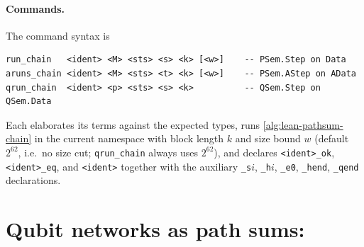 \paragraph{Commands.} The command syntax is
\begin{lstlisting}[style=grammar]
run_chain   <ident> <M> <sts> <s> <k> [<w>]    -- PSem.Step on Data
aruns_chain <ident> <M> <sts> <t> <k> [<w>]    -- PSem.AStep on AData
qrun_chain  <ident> <p> <sts> <s> <k>          -- QSem.Step on QSem.Data
\end{lstlisting}
Each elaborates its terms against the expected types, runs \cref{alg:lean-pathsum-chain} in the
current namespace with block length $k$ and size bound $w$ (default $2^{62}$, i.e.\ no size cut;
\textnormal{\texttt{qrun\_\allowbreak{}chain}} always uses $2^{62}$), and declares \textnormal{\texttt{<ident>\_\allowbreak{}ok}}, \textnormal{\texttt{<ident>\_\allowbreak{}eq}}, and
\textnormal{\texttt{<ident>}} together with the auxiliary \textnormal{\texttt{\_\allowbreak{}s}}$i$, \textnormal{\texttt{\_\allowbreak{}h}}$i$, \textnormal{\texttt{\_\allowbreak{}e0}}, \textnormal{\texttt{\_\allowbreak{}hend}},
\textnormal{\texttt{\_\allowbreak{}qend}} declarations.

\section{Qubit networks as path sums: \texorpdfstring{}{PathSumNet}}\label{sec:lean-pathsum-net}

